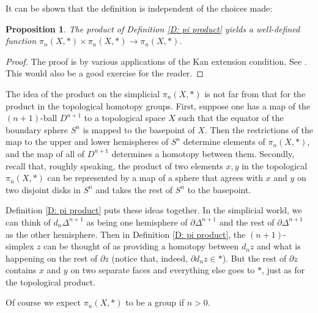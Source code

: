 \documentclass[12pt]{article}
\theoremstyle{plain}
\newtheorem{proposition}[theorem]{Proposition}
\theoremstyle{definition}
\theoremstyle{remark}
\newcommand{\bd}{\partial}
\begin{document}
It can be shown that the definition is independent of the choices made:

\begin{proposition}
The product of Definition \ref{D: pi product} yields a well-defined function $\pi_n(X,*)\times \pi_n(X,*)\to \pi_n(X,*)$.
\end{proposition}
\begin{proof}
The proof is by various applications of the Kan extension condition. See \cite[Lemma 4.2]{MAY67}. This would also be a good exercise for the reader.
\end{proof}


The idea of the product on the simplicial $\pi_n(X,*)$ is not far from that for the product in the topological homotopy groups. First, suppose one has a map of the $(n+1)$-ball $D^{n+1}$ to a topological space $X$ such that the equator of the boundary sphere $S^n$ is mapped to the basepoint of $X$. Then the restrictions of the map to the  upper and lower hemispheres of $S^{n}$ determine elements of $\pi_n(X,*)$, and the map of all of $D^{n+1}$ determines a homotopy between them. Secondly, recall that, roughly speaking, the product of two elements $x,y$ in the topological $\pi_n(X,*)$ can be represented by a map of a sphere that agrees with $x$ and $y$ on two disjoint disks in $S^n$ and takes the rest of $S^n$ to the basepoint.

Definition \ref{D: pi product} puts these ideas together. 
In the simplicial world, we can think of $d_n\Delta^{n+1}$ as being one hemisphere of $\bd \Delta^{n+1}$ and the rest of $\bd \Delta^{n+1}$ as the other hemisphere. Then in  Definition \ref{D: pi product}, the $(n+1)$-simplex $z$ can be thought of as providing a homotopy between $d_nz$ and what is happening on the rest of $\bd z$ (notice that, indeed, $\bd d_nz\in *$). But the rest of $\bd z$ contains $x$ and $y$ on two separate faces and everything else goes to $*$, just as for the topological product.

Of course we expect $\pi_n(X,*)$ to be a group if $n>0$.
\end{document}
